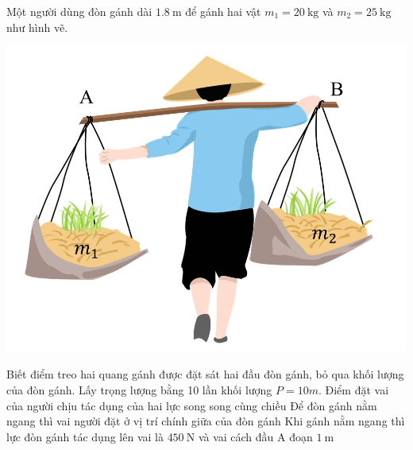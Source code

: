 \begin{ex}
	Một người dùng đòn gánh dài $\SI{1.8}{\meter}$ để gánh hai vật $m_1=\SI{20}{\kilogram}$ và $m_2=\SI{25}{\kilogram}$ như hình vẽ. 
	\begin{center}
		\includegraphics[width=0.3\linewidth]{figs/D10-HKI-KTTX2-001-3}
	\end{center}
	Biết điểm treo hai quang gánh được đặt sát hai đầu đòn gánh, bỏ qua khối lượng của đòn gánh.  Lấy trọng lượng bằng 10 lần khối lượng $P=10m$.
	{\True Điểm đặt vai của người chịu tác dụng của hai lực song song cùng chiều}
	{Để đòn gánh nằm ngang thì vai người đặt ở vị trí chính giữa của đòn gánh}
	{\True Khi gánh nằm ngang thì lực đòn gánh tác dụng lên vai là $\SI{450}{\newton}$ và vai cách đầu A đoạn $\SI{1}{\meter}$}
\end{ex}
